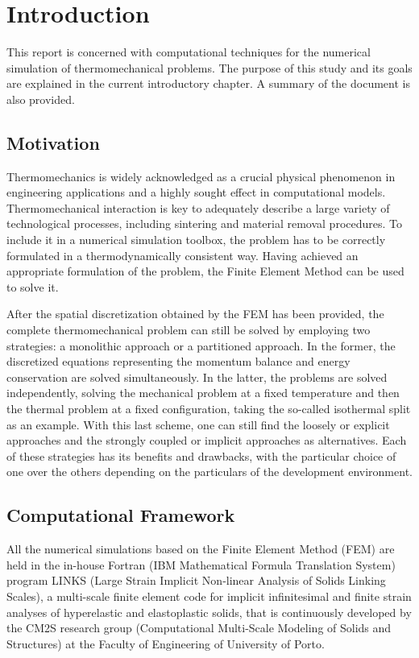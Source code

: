 \chapter{Introduction}

This report is concerned with computational techniques for the numerical simulation of thermomechanical problems.
The purpose of this study and its goals are explained in the current introductory chapter.
A summary of the document is also provided.

\section{Motivation}


Thermomechanics is widely acknowledged as a crucial physical phenomenon in engineering applications and a highly sought effect in computational models.
Thermomechanical interaction is key to adequately describe a large variety of technological processes, including sintering and material removal procedures.
To include it in a numerical simulation toolbox, the problem has to be correctly formulated in a thermodynamically consistent way.
Having achieved an appropriate formulation of the problem, the Finite Element Method can be used to solve it.

After the spatial discretization obtained by the FEM has been provided, the complete thermomechanical problem can still be solved by employing two strategies: a monolithic approach or a partitioned approach.
In the former, the discretized equations representing the momentum balance and energy conservation are solved simultaneously.
In the latter, the problems are solved independently, solving the mechanical problem at a fixed temperature and then the thermal problem at a fixed configuration, taking the so-called isothermal split as an example.
With this last scheme, one can still find the loosely or explicit approaches and the strongly coupled or implicit approaches as alternatives.
Each of these strategies has its benefits and drawbacks, with the particular choice of one over the others depending on the particulars of the development environment.

\section{Computational Framework}

All the numerical simulations based on the Finite Element Method (FEM) are held in the in-house Fortran (IBM Mathematical Formula Translation System) program LINKS (Large Strain Implicit Non-linear Analysis of Solids Linking Scales), a multi-scale finite element code for implicit infinitesimal and finite strain analyses of hyperelastic and elastoplastic solids, that is continuously developed by the CM2S research group (Computational Multi-Scale Modeling of Solids and Structures) at the Faculty of Engineering of University of Porto.

